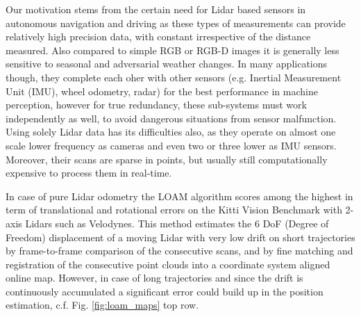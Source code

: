 \documentclass[letterpaper, 10 pt, conference]{ieeeconf}  %
\begin{document}
Our motivation stems from the certain need for Lidar based sensors in autonomous navigation and driving as these types of measurements can provide relatively high precision data, with constant irrespective of the distance measured. Also compared to simple RGB or RGB-D images it is generally less sensitive to seasonal and adversarial weather changes. In many applications though, they complete each oher with other sensors (e.g. Inertial Measurement Unit (IMU), wheel odometry, radar) for the best performance in machine perception, however for true redundancy, these sub-systems must work independently as well, to avoid dangerous situations from sensor malfunction. Using solely Lidar data has its difficulties also, as they operate on almost one scale lower frequency as cameras and even two or three lower as IMU sensors. Moreover, their scans are sparse in points, but usually still computationally expensive to process them in real-time.


In case of pure Lidar odometry the LOAM \cite{loam} algorithm scores among the highest in term of translational and rotational errors on the Kitti Vision Benchmark \cite{kitti} with 2-axis Lidars such as Velodynes.
This method estimates the 6 DoF (Degree of Freedom) displacement of a moving Lidar with very low drift on short trajectories by frame-to-frame comparison of the consecutive scans, and by fine matching and registration of the consecutive point clouds into a coordinate system aligned online map. 
However, in case of long trajectories and since the drift is continuously accumulated a significant error could build up in the position estimation, c.f. Fig. \ref{fig:loam_maps} top row.
\end{document}

